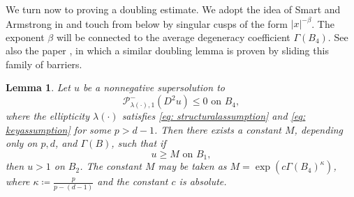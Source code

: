 \documentclass[reqno]{amsart}
\numberwithin{equation}{section}
\newtheorem{lem}[thm]{Lemma}
\numberwithin{equation}{section}
\newcommand{\ds}{\displaystyle}
\begin{document}
We turn now to proving a doubling estimate. We adopt the idea of Smart and Armstrong in \cite{ArmstrongSmart2014} and touch from below by singular cusps of the form $|x|^{-\beta}$. The exponent $\beta$ will be connected to the average degeneracy coefficient $\Gamma(B_4)$. See also the paper \cite{Mooney2015}, in which a similar doubling lemma is proven by sliding this family of barriers.
\begin{lem}
\label{lem: doubling}
        Let $u$ be a nonnegative supersolution to
        $$\mathcal{P}^-_{\lambda(\cdot),1}(D^2u) \le 0 \text{ on } B_4,$$
        where the ellipticity $\lambda(\cdot)$ satisfies \eqref{eq: structuralassumption} and \eqref{eq: keyassumption} for some $p>d-1$. Then there exists a constant $M$, depending only on $p, d$, and $\Gamma(B)$, such that if 
        $$u \ge M \text{ on } B_1,$$
        then $u>1$ on $B_2$. The constant $M$ may be taken as $M = \exp(c \Gamma(B_4)^\kappa)$, where $\kappa \coloneqq \ds \frac{p}{p-(d-1)}$ and the constant $c$ is absolute.
\end{lem}
\end{document}
